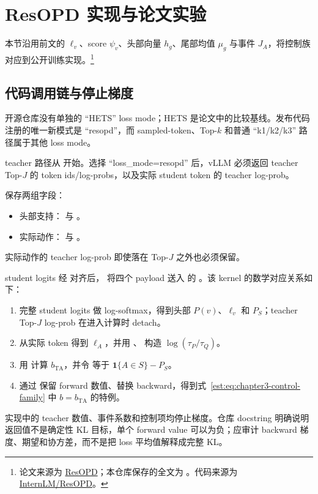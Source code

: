 \section{ResOPD 实现与论文实验}
\label{sec:resopd-implementation}

本节沿用前文的 $\ell_v$、score $\psi_v$、头部向量 $h_g$、尾部均值 $\mu_g$ 与事件 $J_A$，将控制族对应到公开训练实现。\footnote{论文来源为 \href{https://arxiv.org/abs/2610.04882}{ResOPD}；本仓库保存的全文为 。代码来源为 \href{https://github.com/InternLM/ResOPD}{InternLM/ResOPD}。}

\subsection{代码调用链与停止梯度}

开源仓库没有单独的 ``HETS'' loss mode；HETS 是论文中的比较基线。发布代码注册的唯一新模式是 ``resopd''，而 sampled-token、Top-$k$ 和普通 ``k1/k2/k3'' 路径属于其他 loss mode。

teacher 路径从  开始。选择 ``loss\_mode=resopd'' 后，vLLM 必须返回 teacher Top-$J$ 的 token ids/log-probs，以及实际 student token 的 teacher log-prob。

 保存两组字段：
\begin{itemize}
\item 头部支持： 与 。
\item 实际动作： 与 。
\end{itemize}
实际动作的 teacher log-prob 即使落在 Top-$J$ 之外也必须保留。

student logits 经  对齐后， 将四个 payload 送入  的 。该 kernel 的数学对应关系如下：
\begin{enumerate}
\item 完整 student logits 做 log-softmax，得到头部 $P(v)$、$\ell_v$ 和 $P_S$；teacher Top-$J$ log-prob 在进入计算时 detach。
\item 从实际 token 得到 $\ell_A$，并用 、 构造 $\log(\tau_P/\tau_Q)$。
\item 用  计算 $b_{\mathrm{TA}}$，并令  等于 $\mathbf 1\{A\in S\}-P_S$。
\item 通过  保留 forward 数值、替换 backward，得到式~\eqref{est:eq:chapter3-control-family} 中 $b=b_{\mathrm{TA}}$ 的特例。
\end{enumerate}
实现中的 teacher 数值、事件系数和控制项均停止梯度。仓库 docstring 明确说明返回值不是确定性 KL 目标，单个 forward value 可以为负；应审计 backward 梯度、期望和协方差，而不是把 loss 平均值解释成完整 KL。

